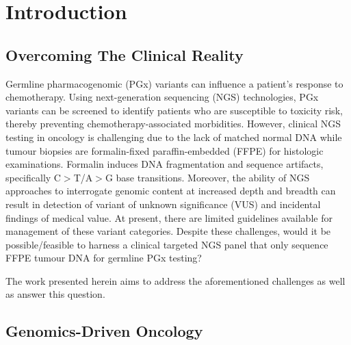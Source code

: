 
\chapter{Introduction}
\label{ch:Introduction}

\section{Overcoming The Clinical Reality}
\label{sec:OvercomingTheClinical Reality}

Germline pharmacogenomic (PGx) variants can influence a patient's response to chemotherapy. Using next-generation sequencing (NGS) technologies, PGx variants can be screened to identify patients who are susceptible to toxicity risk, thereby preventing chemotherapy-associated morbidities. However, clinical NGS testing in oncology is challenging due to the lack of matched normal DNA while tumour biopsies are formalin-fixed paraffin-embedded (FFPE) for histologic examinations. Formalin induces DNA fragmentation and sequence artifacts, specifically C$>$T/A$>$G base transitions. Moreover, the ability of NGS approaches to interrogate genomic content at increased depth and breadth can result in detection of variant of unknown significance (VUS) and incidental findings of medical value. At present, there are limited guidelines available for management of these variant categories. Despite these challenges, would it be possible/feasible to harness a clinical targeted NGS panel that only sequence FFPE tumour DNA for germline PGx testing?

The work presented herein aims to address the aforementioned challenges as well as answer this question.

\section{Genomics-Driven Oncology}
\label{sec:Genomics-DrivenOncology}

